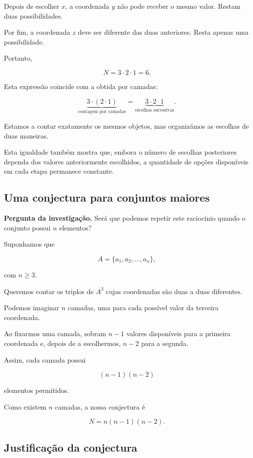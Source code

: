 \documentclass[11pt,a4paper,oneside]{book}
\newcommand{\Pergunta}[1]{\begin{perguntabox}\textbf{Pergunta da investigação.} #1\end{perguntabox}}
\begin{document}
Depois de escolher $x$, a coordenada $y$ não pode
receber o mesmo valor. Restam duas possibilidades.

Por fim, a coordenada $z$ deve ser diferente das
duas anteriores. Resta apenas uma possibilidade.

Portanto,

\[
\boxed{N=3\cdot2\cdot1=6}.
\]

Esta expressão coincide com a obtida por camadas:

\[
\underbrace{3\cdot(2\cdot1)}_{\text{contagem por camadas}}
=
\underbrace{3\cdot2\cdot1}_{\text{escolhas sucessivas}}.
\]

Estamos a contar exatamente os mesmos objetos,
mas organizámos as escolhas de duas maneiras.

Esta igualdade também mostra que, embora o número
de escolhas posteriores dependa dos valores
anteriormente escolhidos, a quantidade de opções
disponíveis em cada etapa permanece constante.

\subsection*{Uma conjectura para conjuntos maiores}

\Pergunta{Será que podemos repetir este raciocínio
quando o conjunto possui $n$ elementos?}

Suponhamos que

\[
A=\{a_1,a_2,\ldots,a_n\},
\]

com $n\geq3$.

Queremos contar os triplos de $A^3$ cujas
coordenadas são duas a duas diferentes.

Podemos imaginar $n$ camadas, uma para cada possível
valor da terceira coordenada.

Ao fixarmos uma camada, sobram $n-1$ valores
disponíveis para a primeira coordenada e,
depois de a escolhermos, $n-2$ para a segunda.

Assim, cada camada possui

\[
(n-1)(n-2)
\]

elementos permitidos.

Como existem $n$ camadas, a nossa conjectura é

\[
\boxed{N=n(n-1)(n-2)}.
\]

\subsection*{Justificação da conjectura}
\end{document}
